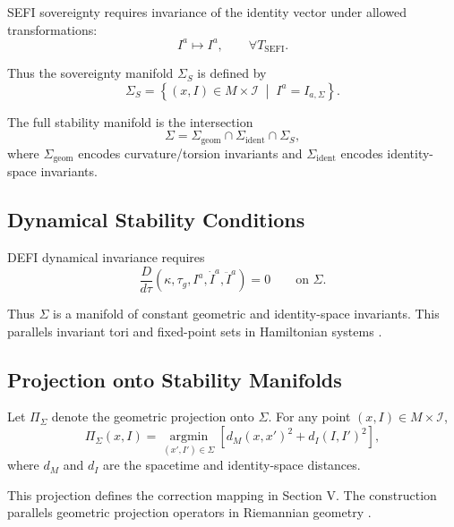 \documentclass[aip,jmp,reprint,onecolumn,nofootinbib]{revtex4-2}
\begin{document}
SEFI sovereignty requires invariance of the identity vector under allowed transformations:
\begin{equation}
I^a \mapsto I^a, \qquad \forall T_{\mathrm{SEFI}}.
\end{equation}

Thus the sovereignty manifold $\Sigma_S$ is defined by
\begin{equation}
\Sigma_S = \left\{
(x,I) \in M \times \mathcal{I}
\;\middle|\;
I^a = I_{a,\Sigma}
\right\}.
\end{equation}

The full stability manifold is the intersection
\begin{equation}
\Sigma = \Sigma_{\mathrm{geom}} \cap \Sigma_{\mathrm{ident}} \cap \Sigma_S,
\end{equation}
where $\Sigma_{\mathrm{geom}}$ encodes curvature/torsion invariants and 
$\Sigma_{\mathrm{ident}}$ encodes identity-space invariants.

\subsection{Dynamical Stability Conditions}

DEFI dynamical invariance \cite{DuttonDEFI2026} requires
\begin{equation}
\frac{D}{d\tau}
\left(
\kappa, \tau_g, I^a, \dot{I}^a, \ddot{I}^a
\right)
= 0
\qquad \text{on } \Sigma.
\end{equation}

Thus $\Sigma$ is a manifold of constant geometric and identity-space invariants. This 
parallels invariant tori and fixed-point sets in Hamiltonian systems 
\cite{ArnoldMechanics,MarsdenWest}.

\subsection{Projection onto Stability Manifolds}

Let $\Pi_\Sigma$ denote the geometric projection onto $\Sigma$. For any point 
$(x,I) \in M \times \mathcal{I}$,
\begin{equation}
\Pi_\Sigma(x,I)
=
\operatorname*{argmin}_{(x',I') \in \Sigma}
\left[
d_M(x,x')^2 + d_I(I,I')^2
\right],
\end{equation}
where $d_M$ and $d_I$ are the spacetime and identity-space distances.

This projection defines the correction mapping in Section V. The construction parallels 
geometric projection operators in Riemannian geometry \cite{doCarmo}.
\end{document}
